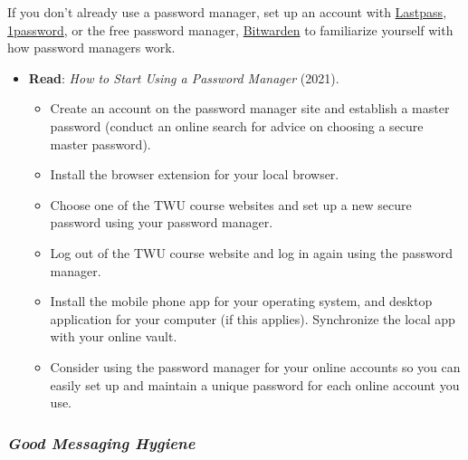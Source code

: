 \documentclass[
  letterpaper,
  DIV=11,
  numbers=noendperiod]{scrreprt}
\providecommand{\tightlist}{%
  \setlength{\itemsep}{0pt}\setlength{\parskip}{0pt}}\usepackage{longtable,booktabs,array}
\begin{document}
\begin{tcolorbox}[enhanced jigsaw, toprule=.15mm, colback=white, colframe=quarto-callout-note-color-frame, bottomtitle=1mm, leftrule=.75mm, coltitle=black, titlerule=0mm, rightrule=.15mm, colbacktitle=quarto-callout-note-color!10!white, left=2mm, title={Learning Activity}, opacitybacktitle=0.6, opacityback=0, breakable, toptitle=1mm, arc=.35mm, bottomrule=.15mm]

If you don't already use a password manager, set up an account with
\href{https://www.lastpass.com/}{Lastpass},
\href{https://1password.com/}{1password}, or the free password manager,
\href{https://bitwarden.com/}{Bitwarden} to familiarize yourself with
how password managers work.

\begin{itemize}
\tightlist
\item
  \textbf{Read}: \emph{How to Start Using a Password Manager} (2021).

  \begin{itemize}
  \tightlist
  \item
    Create an account on the password manager site and establish a
    master password (conduct an online search for advice on choosing a
    secure master password).
  \item
    Install the browser extension for your local browser.
  \item
    Choose one of the TWU course websites and set up a new secure
    password using your password manager.
  \item
    Log out of the TWU course website and log in again using the
    password manager.
  \item
    Install the mobile phone app for your operating system, and desktop
    application for your computer (if this applies). Synchronize the
    local app with your online vault.
  \item
    Consider using the password manager for your online accounts so you
    can easily set up and maintain a unique password for each online
    account you use.
  \end{itemize}
\end{itemize}

\end{tcolorbox}

\subsubsection*{\texorpdfstring{\emph{Good Messaging
Hygiene}}{Good Messaging Hygiene}}\label{good-messaging-hygiene}
\end{document}
